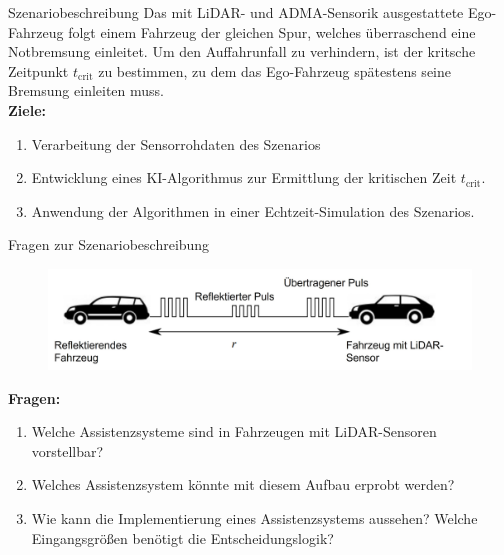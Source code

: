\documentclass[169, handout	]{THIbeamer} %
\begin{document}
	\begin{frame}{Szenariobeschreibung}
		Das mit LiDAR- und ADMA-Sensorik ausgestattete Ego-Fahrzeug folgt einem Fahrzeug der gleichen Spur, welches überraschend eine Notbremsung einleitet. Um den Auffahrunfall zu verhindern, ist der kritsche Zeitpunkt $t_{\text{crit}}$ zu bestimmen, zu dem das Ego-Fahrzeug spätestens seine Bremsung einleiten muss.
		\\
		\textbf{Ziele:} \\
		\begin{enumerate}
			\item Verarbeitung der Sensorrohdaten des Szenarios
			\item Entwicklung eines KI-Algorithmus zur Ermittlung der kritischen Zeit $t_{\text{crit}}$.
			\item Anwendung der Algorithmen in einer Echtzeit-Simulation des Szenarios.
		\end{enumerate}
	\end{frame}
	\begin{frame}{Fragen zur Szenariobeschreibung}
		\begin{figure}

			\includegraphics[scale=0.4]{"required/Szenariobeschreibung_auto.jpg"}

		\end{figure}	
		\textbf{Fragen:}\\
		\begin{enumerate}
			\item Welche Assistenzsysteme sind in Fahrzeugen mit LiDAR-Sensoren vorstellbar?
			\item Welches Assistenzsystem könnte mit diesem Aufbau erprobt werden?
			\item Wie kann die Implementierung eines Assistenzsystems aussehen? Welche Eingangsgrößen benötigt die Entscheidungslogik?
		\end{enumerate}
	\end{frame}
\end{document}

